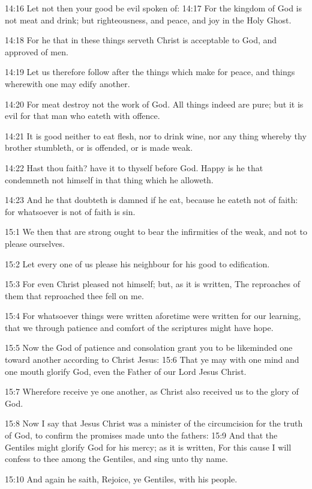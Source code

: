 14:16 Let not then your good be evil spoken of: 14:17 For the kingdom
of God is not meat and drink; but righteousness, and peace, and joy in
the Holy Ghost.

14:18 For he that in these things serveth Christ is acceptable to God,
and approved of men.

14:19 Let us therefore follow after the things which make for peace,
and things wherewith one may edify another.

14:20 For meat destroy not the work of God. All things indeed are
pure; but it is evil for that man who eateth with offence.

14:21 It is good neither to eat flesh, nor to drink wine, nor any
thing whereby thy brother stumbleth, or is offended, or is made weak.

14:22 Hast thou faith? have it to thyself before God. Happy is he that
condemneth not himself in that thing which he alloweth.

14:23 And he that doubteth is damned if he eat, because he eateth not
of faith: for whatsoever is not of faith is sin.

15:1 We then that are strong ought to bear the infirmities of the
weak, and not to please ourselves.

15:2 Let every one of us please his neighbour for his good to
edification.

15:3 For even Christ pleased not himself; but, as it is written, The
reproaches of them that reproached thee fell on me.

15:4 For whatsoever things were written aforetime were written for our
learning, that we through patience and comfort of the scriptures might
have hope.

15:5 Now the God of patience and consolation grant you to be
likeminded one toward another according to Christ Jesus: 15:6 That ye
may with one mind and one mouth glorify God, even the Father of our
Lord Jesus Christ.

15:7 Wherefore receive ye one another, as Christ also received us to
the glory of God.

15:8 Now I say that Jesus Christ was a minister of the circumcision
for the truth of God, to confirm the promises made unto the fathers:
15:9 And that the Gentiles might glorify God for his mercy; as it is
written, For this cause I will confess to thee among the Gentiles, and
sing unto thy name.

15:10 And again he saith, Rejoice, ye Gentiles, with his people.

